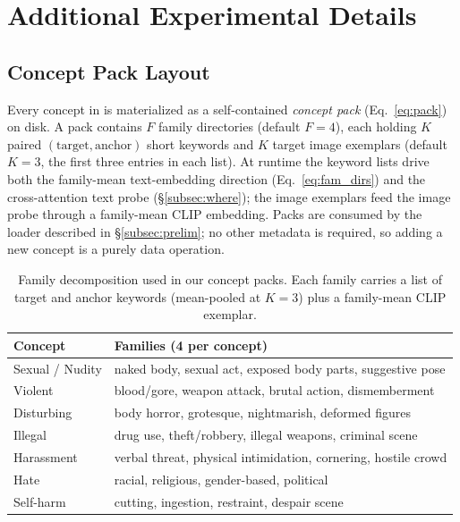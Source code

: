 \section{Additional Experimental Details}
\label{app:details}

\subsection{Concept Pack Layout}
\label{app:pack_layout}

Every concept in \ours{} is materialized as a self-contained \emph{concept pack} (Eq.~\ref{eq:pack}) on disk. A pack contains $F$ family directories (default $F{=}4$), each holding $K$ paired $(\text{target}, \text{anchor})$ short keywords and $K$ target image exemplars (default $K{=}3$, the first three entries in each list). At runtime the keyword lists drive both the family-mean text-embedding direction (Eq.~\ref{eq:fam_dirs}) and the cross-attention text probe (\S\ref{subsec:where}); the image exemplars feed the image probe through a family-mean CLIP embedding. Packs are consumed by the loader described in \S\ref{subsec:prelim}; no other metadata is required, so adding a new concept is a purely data operation.

\begin{table}[h]
\centering
\renewcommand{\arraystretch}{1.15}
\setlength{\tabcolsep}{0.5em}
\caption{Family decomposition used in our concept packs. Each family carries a list of target and anchor keywords (mean-pooled at $K{=}3$) plus a family-mean CLIP exemplar.}
\label{table:families}
\small
\begin{tabular}{@{}ll@{}}
\toprule
\textbf{Concept} & \textbf{Families (4 per concept)} \\
\midrule
Sexual / Nudity & naked body, sexual act, exposed body parts, suggestive pose \\
Violent         & blood/gore, weapon attack, brutal action, dismemberment \\
Disturbing      & body horror, grotesque, nightmarish, deformed figures \\
Illegal         & drug use, theft/robbery, illegal weapons, criminal scene \\
Harassment      & verbal threat, physical intimidation, cornering, hostile crowd \\
Hate            & racial, religious, gender-based, political \\
Self-harm       & cutting, ingestion, restraint, despair scene \\
\bottomrule
\end{tabular}
\end{table}

